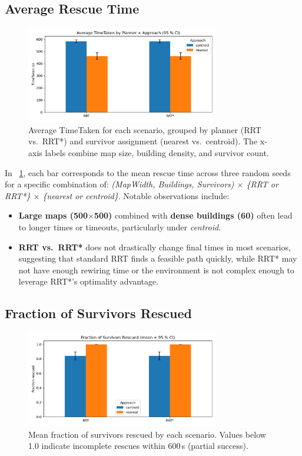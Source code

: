 \documentclass[12pt,a4paper]{report}
\begin{document}
\subsection{Average Rescue Time}
\begin{figure}[H]
    \centering
    \includegraphics[width=0.75\textwidth]{figures/avg_time_taken.png}
    \caption{Average TimeTaken for each scenario, grouped by planner (RRT vs.\ RRT*) 
             and survivor assignment (nearest vs.\ centroid). The x-axis labels 
             combine map size, building density, and survivor count.}
    \label{fig:avg_time_taken}
\end{figure}

\noindent
In \figurename~\ref{fig:avg_time_taken}, each bar corresponds to the mean rescue time
across three random seeds for a specific combination of:
\emph{(MapWidth, Buildings, Survivors) $\times$ \{RRT or RRT*\} $\times$ \{nearest or centroid\}}.
Notable observations include:
\begin{itemize}
    \item \textbf{Large maps (500$\times$500)} combined with \textbf{dense buildings (60)}
          often lead to longer times or timeouts, particularly under \emph{centroid}.
    \item \textbf{RRT vs.\ RRT*} does not drastically change final times in most scenarios,
          suggesting that standard RRT finds a feasible path quickly, while RRT* 
          may not have enough rewiring time or the environment is not complex enough 
          to leverage RRT*'s optimality advantage.
\end{itemize}

\subsection{Fraction of Survivors Rescued}
\begin{figure}[H]
    \centering
    \includegraphics[width=0.75\textwidth]{figures/fraction_rescued.png}
    \caption{Mean fraction of survivors rescued by each scenario. Values below 1.0 
             indicate incomplete rescues within 600\,s (partial success).}
    \label{fig:fraction_rescued}
\end{figure}
\end{document}
